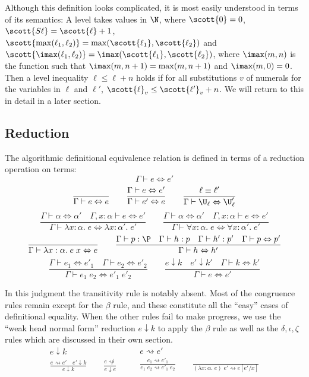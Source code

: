 Although this definition looks complicated, it is most easily understood in terms of its semantics: A level takes values in $\N$, where $\scott{0}=0$, $\scott{S\ell}=\scott{\ell}+1$, $\scott{\max(\ell_1,\ell_2)}=\max(\scott{\ell_1},\scott{\ell_2})$ and $\scott{\imax(\ell_1,\ell_2)}=\imax(\scott{\ell_1},\scott{\ell_2})$, where $\imax(m,n)$ is the function such that $\imax(m,n+1)=\max(m,n+1)$ and $\imax(m,0)=0$. Then a level inequality $\ell\le\ell+n$ holds if for all substitutions $v$ of numerals for the variables in $\ell$ and $\ell'$, $\scott{\ell}_v\le \scott{\ell'}_v+n$. We will return to this in detail in a later section.

\subsection{Reduction}
The algorithmic definitional equivalence relation is defined in terms of a reduction operation on terms:
%
$$\boxed{\Gamma\vdash e\Leftrightarrow e'}$$
$$\frac{}{\Gamma\vdash e\Leftrightarrow e}\qquad
\frac{\Gamma\vdash e\Leftrightarrow e'}{\Gamma\vdash e'\Leftrightarrow e}\qquad
\frac{\ell\equiv\ell'}{\Gamma\vdash\U_\ell\Leftrightarrow\U_\ell'}$$
$$\frac{\Gamma\vdash\alpha\Leftrightarrow\alpha'\quad \Gamma,x:\alpha\vdash e\Leftrightarrow e'}{\Gamma\vdash\lambda x:\alpha.\;e\Leftrightarrow \lambda x:\alpha'.\;e'}\qquad
\frac{\Gamma\vdash\alpha\Leftrightarrow\alpha'\quad \Gamma,x:\alpha\vdash e\Leftrightarrow e'}{\Gamma\vdash\forall x:\alpha.\;e\Leftrightarrow \forall x:\alpha'.\;e'}$$
$$\frac{}{\Gamma\vdash \lambda x:\alpha.\;e\;x\Leftrightarrow e}\qquad
\frac{\Gamma\vdash p:\P\quad \Gamma\vdash h:p\quad \Gamma\vdash h':p'\quad \Gamma \vdash p\Leftrightarrow p'}{\Gamma \vdash h\Leftrightarrow h'}$$
$$\frac{\Gamma\vdash e_1\Leftrightarrow e'_1\quad \Gamma\vdash e_2\Leftrightarrow e'_2}{\Gamma\vdash e_1\;e_2\Leftrightarrow e'_1\;e'_2}\qquad
\frac{e\downarrow k\quad e'\downarrow k'\quad \Gamma\vdash k\Leftrightarrow k'}{\Gamma\vdash e\Leftrightarrow e'}$$

In this judgment the transitivity rule is notably absent. Most of the congruence rules remain except for the $\beta$ rule, and these constitute all the ``easy'' cases of definitional equality. When the other rules fail to make progress, we use the ``weak head normal form'' reduction $e\downarrow k$ to apply the $\beta$ rule as well as the $\delta,\iota,\zeta$ rules which are discussed in their own section.
%
$$
\begin{matrix}
\boxed{e\downarrow k}\\[4mm]
\displaystyle{
\frac{e\rightsquigarrow e'\quad e'\downarrow k}{e\downarrow k}\qquad
\frac{e\not\rightsquigarrow}{e\downarrow e}}
\end{matrix}\qquad
\begin{matrix}
\boxed{e\rightsquigarrow e'}\\[4mm]
\displaystyle{
\frac{e_1\rightsquigarrow e'_1}{e_1\;e_2\rightsquigarrow e'_1\;e_2}\qquad
\frac{}{(\lambda x:\alpha.\;e)\;e'\rightsquigarrow e[e'/x]}}
\end{matrix}
$$

